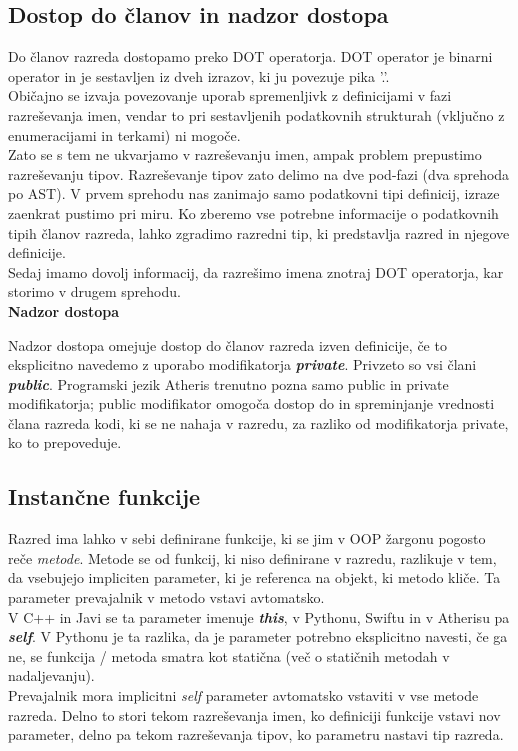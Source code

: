 \documentclass[a4paper, 12pt]{book}
\begin{document}
\subsection{Dostop do članov in nadzor dostopa}

Do članov razreda dostopamo preko DOT operatorja. DOT operator je binarni operator in je sestavljen iz dveh izrazov, ki ju povezuje pika '.'. \\
\indent Običajno se izvaja povezovanje uporab spremenljivk z definicijami v fazi razreševanja imen, vendar to pri sestavljenih podatkovnih strukturah (vključno z enumeracijami in terkami) ni mogoče.\\
\indent Zato se s tem ne ukvarjamo v razreševanju imen, ampak problem prepustimo razreševanju tipov. Razreševanje tipov zato delimo na dve pod-fazi (dva sprehoda po AST). V prvem sprehodu nas zanimajo samo podatkovni tipi definicij, izraze zaenkrat pustimo pri miru. Ko zberemo vse potrebne informacije o podatkovnih tipih članov razreda, lahko zgradimo razredni tip, ki predstavlja razred in njegove definicije. \\
\indent Sedaj imamo dovolj informacij, da razrešimo imena znotraj DOT operatorja, kar storimo v drugem sprehodu.\\

\textbf{Nadzor dostopa}

Nadzor dostopa omejuje dostop do članov razreda izven definicije, če to eksplicitno navedemo z uporabo modifikatorja \textit{\textbf{private}}. Privzeto so vsi člani \textit{\textbf{public}}. Programski jezik Atheris trenutno pozna samo public in private modifikatorja; public modifikator omogoča dostop do in spreminjanje vrednosti člana razreda kodi, ki se ne nahaja v razredu, za razliko od modifikatorja private, ko to prepoveduje. 

\subsection{Instančne funkcije}

Razred ima lahko v sebi definirane funkcije, ki se jim v OOP žargonu pogosto reče \textit{metode}. Metode se od funkcij, ki niso definirane v razredu, razlikuje v tem, da vsebujejo impliciten parameter, ki je referenca na objekt, ki metodo kliče. Ta parameter prevajalnik v metodo vstavi avtomatsko. \\
\indent V C++ in Javi se ta parameter imenuje \textbf{\textit{this}}, v Pythonu, Swiftu in v Atherisu pa \textbf{\textit{self}}. V Pythonu je ta razlika, da je parameter potrebno eksplicitno navesti, če ga ne, se funkcija / metoda smatra kot statična (več o statičnih metodah v nadaljevanju). \\
\indent Prevajalnik mora implicitni \textit{self} parameter avtomatsko vstaviti v vse metode razreda. Delno to stori tekom razreševanja imen, ko definiciji funkcije vstavi nov parameter, delno pa tekom razreševanja tipov, ko parametru nastavi tip razreda. \\
\end{document}
